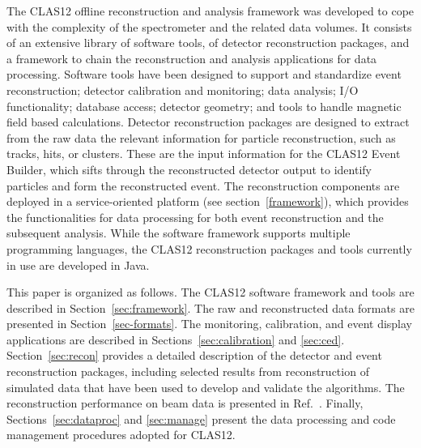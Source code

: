 The CLAS12 offline reconstruction and analysis framework was developed to cope with the complexity of the
spectrometer and the related data volumes. It consists of an extensive library of software tools, of detector
reconstruction packages, and a framework to chain the reconstruction and analysis applications for data
processing. Software tools have been designed to
support and standardize event reconstruction; detector
calibration and monitoring; data analysis; I/O functionality; database access; detector geometry; and tools to handle magnetic field based calculations.  Detector reconstruction packages are designed to
extract from the raw data the relevant information for particle reconstruction, such as tracks, hits, or clusters.
These are the input information for the CLAS12 Event Builder, which sifts through the reconstructed detector
output to identify particles and form the reconstructed event. The reconstruction components are deployed in a
service-oriented platform (see section~\ref{framework}), which provides the functionalities for data processing for both event reconstruction
and the subsequent analysis. While the software framework supports multiple programming languages, the CLAS12
reconstruction packages and tools currently in use are developed in Java.

This paper is organized as follows. The CLAS12 software framework and tools are described in
Section~\ref{sec:framework}. The raw and reconstructed data formats are presented in Section~\ref{sec-formats}.
The monitoring, calibration, and event display applications are described in Sections~\ref{sec:calibration} and
\ref{sec:ced}. Section~\ref{sec:recon} provides a detailed description of the detector and event reconstruction
packages, including selected results from reconstruction of simulated data that have been used to develop and
validate the algorithms. The reconstruction performance on beam data is presented in Ref.~\cite{clas12-nim}.
Finally, Sections~\ref{sec:dataproc} and \ref{sec:manage} present the data processing and code management
procedures adopted for CLAS12.
